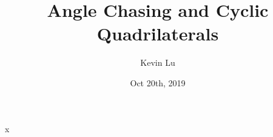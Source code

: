 \documentclass[11pt]{article}
\title{Angle Chasing and Cyclic Quadrilaterals}
\author{Kevin Lu}
\date{Oct 20th, 2019}
\begin{document}
    \maketitle
x
\end{document}
